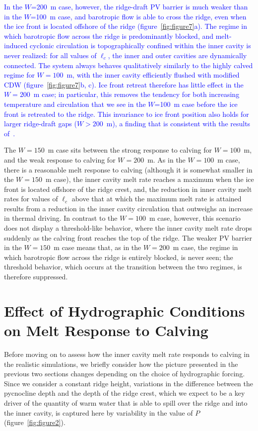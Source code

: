 \documentclass[draft]{agujournal2019}
\newcommand{\blue}[1]{\textcolor{blue}{#1}}
\begin{document}
\blue{In the $W$=200~m case, however, the ridge-draft PV barrier is much weaker than in the $W$=100~m case, and barotropic flow is able to cross the ridge, even when the ice front is located offshore of the ridge (figure~\ref{fig:figure7}a). The regime in which barotropic flow across the ridge is predominantly blocked, and melt-induced cyclonic circulation is topographically confined within the inner cavity is never realized: for all values of $\ell_c$, the inner and outer cavities are dynamically connected. The system always behaves qualitatively similarly to the highly calved regime for $W = 100$~m, with the inner cavity efficiently flushed with modified CDW (figure~\ref{fig:figure7}b, c). Ice front retreat therefore has little effect in the $W = 200$~m case; in particular, this removes the tendency for both increasing temperature and circulation that we see in the $W$=100~m case before the ice front is retreated to the ridge. This invariance to ice front position also holds for larger ridge-draft gaps ($W>200$~m), a finding that is consistent with the results of~\citeA{DeRydt2014JGeophysResOceans}.}

The $W = 150$~m case sits between the strong response to calving for $W = 100$~m, and the weak response to calving for $W = 200$~m. As in the $W = 100$~m case, there is a reasonable melt response to calving (although it is somewhat smaller in the $W = 150$~m case), the inner cavity melt rate reaches a maximum when the ice front is located offshore of the ridge crest, and, the reduction in inner cavity melt rates for values of $\ell_c$ above that at which the maximum melt rate is attained results from a reduction in the inner cavity circulation that outweighs an increase in thermal driving. In contrast to the $W = 100$~m case, however, this scenario does not display a threshold-like behavior, where the inner cavity melt rate drops suddenly as the calving front reaches the top of the ridge. The weaker PV barrier in the $W=150$~m case means that, as in the $W = 200$~m case, the regime in which barotropic flow across the ridge is entirely blocked, is never seen; the threshold behavior, which occurs at the transition between the two regimes, is therefore suppressed.


\section{Effect of Hydrographic Conditions on Melt Response to Calving}\label{S:Results:P}
Before moving on to assess how the inner cavity melt rate responds to calving in the realistic simulations, we briefly consider how the picture presented in the previous two sections changes depending on the choice of hydrographic forcing. Since we consider a constant ridge height, variations in the difference between the pycnocline depth and the depth of the ridge crest, which we expect to be a key driver of the quantity of warm water that is able to spill over the ridge and into the inner cavity, is captured here by variability in the value of $P$ (figure~\ref{fig:figure2}).
\end{document}
